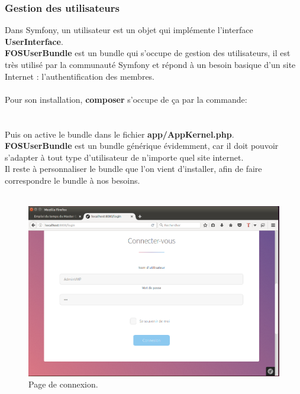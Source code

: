 \documentclass[12pt]{article}
\begin{document}
\subsubsection{Gestion des utilisateurs}
Dans Symfony, un utilisateur est un objet qui implémente l'interface \textbf{UserInterface}.\\

\textbf{FOSUserBundle} est un bundle qui s'occupe de gestion des utilisateurs, il est très utilisé par la communauté Symfony et répond à un besoin  basique d'un site Internet : l'authentification des membres.\\ \\

Pour son installation, \textbf{composer} s'occupe de ça par la commande:\\

\\ \\
Puis on active le bundle dans le fichier \textbf{app/AppKernel.php}.\\
\textbf{FOSUserBundle} est un bundle générique évidemment, car il doit pouvoir s'adapter à tout type d'utilisateur de n'importe quel site internet.\\
Il reste à personnaliser le bundle que l'on vient d'installer, 
afin de faire correspondre le bundle à nos besoins. \\
\\
\begin{center}
\begin{figure}[htp]
  \centering
  \includegraphics[width=12cm]{v5.png}
  \caption{Page de connexion.}
  \label{fig:une-autre-image}
\end{figure}
\end{center}
\end{document}
